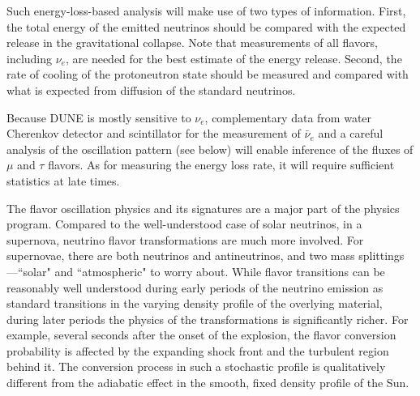 Such energy-loss-based analysis will make use of two types of information. First, the total energy of the emitted neutrinos should be compared with the expected release in the gravitational collapse.  Note that measurements of all flavors, including $\nu_e$, are needed for the best estimate of the energy release.
Second, the rate of cooling of the protoneutron state should be measured and compared with what is expected from diffusion of the standard neutrinos.%

Because DUNE is mostly sensitive to $\nu_e$, complementary data from
water Cherenkov detector and scintillator for the measurement of
$\bar\nu_{e}$ and a careful analysis of the oscillation pattern (see
below) will enable inference of the fluxes of $\mu$ and $\tau$
flavors. As for measuring the energy loss rate, it will require
sufficient statistics at late times.

The flavor oscillation physics and its signatures are a major part of
the physics program. Compared to the well-understood case of solar
neutrinos, in a supernova, neutrino flavor transformations are much
more involved. For supernovae, there are both neutrinos and antineutrinos, and
two mass splittings---``solar" and ``atmospheric" to worry about.
While flavor transitions can be reasonably well understood during 
early periods of the neutrino emission as standard  
transitions in the varying density profile of the overlying material, during
later periods the physics of the transformations is significantly richer.
For example, several seconds after the onset of the explosion, the
flavor conversion probability is affected by the expanding shock front
and the turbulent region behind it. The conversion process in such a
stochastic profile is qualitatively different from the adiabatic 
effect in the smooth, fixed density profile of the Sun. 

